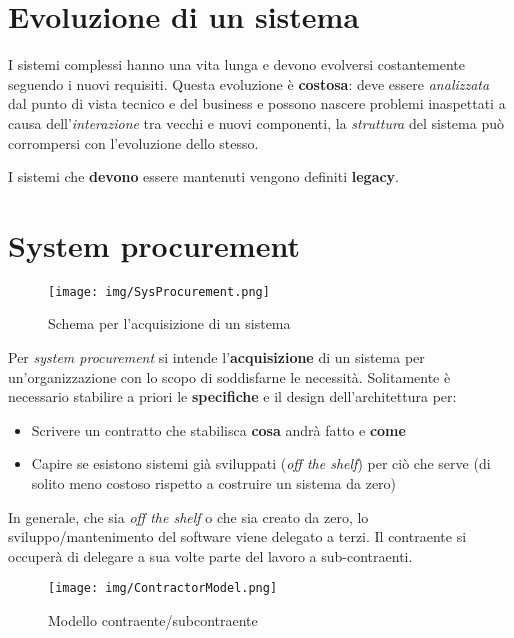 
\section{Evoluzione di un sistema}
I sistemi complessi hanno una vita lunga e devono evolversi costantemente
seguendo i nuovi requisiti. Questa evoluzione \`e \textbf{costosa}:
deve essere \textit{analizzata} dal punto di vista tecnico e del business
e possono nascere problemi inaspettati a causa dell'\textit{interazione} tra
vecchi e nuovi componenti, la \textit{struttura} del sistema pu\`o
corrompersi con l'evoluzione dello stesso.

I sistemi che \textbf{devono} essere mantenuti vengono definiti \textbf{legacy}.

\section{System procurement}

\begin{figure}[H]
        \centering
        \texttt{[image: img/SysProcurement.png]}
        \caption*{Schema per l'acquisizione di un sistema}
\end{figure}

Per \textit{system procurement} si intende l'\textbf{acquisizione} di un
sistema per un'organizzazione con lo scopo di soddisfarne le necessit\`a.
Solitamente \`e necessario stabilire a priori le \textbf{specifiche}
e il design dell'architettura per:
\begin{itemize}
        \item Scrivere un contratto che stabilisca \textbf{cosa}
                andr\`a fatto e \textbf{come}
        \item Capire se esistono sistemi gi\`a sviluppati
                (\textit{off the shelf}) per ci\`o
                che serve (di solito meno costoso rispetto a costruire
                un sistema da zero)
\end{itemize}

In generale, che sia \textit{off the shelf} o che sia creato da zero,
lo sviluppo/mantenimento del software viene delegato a terzi.
Il contraente si occuper\`a di delegare a sua volte parte del lavoro
a sub-contraenti.

\begin{figure}[h]
        \centering
        \texttt{[image: img/ContractorModel.png]}
        \caption*{Modello contraente/subcontraente}
\end{figure}

